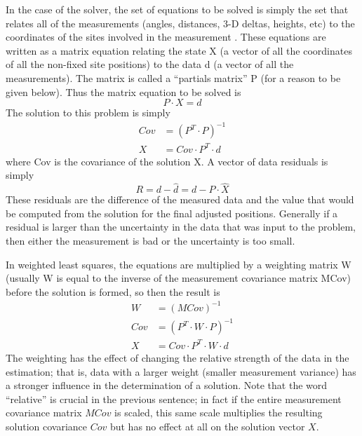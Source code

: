 In the case of the solver, the set of equations to be solved is simply the set that relates all of the measurements (angles, distances, 3-D deltas, heights, etc) to the coordinates of the sites involved in the measurement \cite{ghilani} \cite{leick}. These equations are written as a matrix equation relating the state X (a vector of all the coordinates of all the non-fixed site positions) to the data d (a vector of all the measurements). The matrix is called a ``partials matrix'' P (for a reason to be given below). Thus the matrix equation to be solved is
\begin{equation}
P \cdot X = d
\end{equation}
The solution to this problem is simply
\begin{equation}
\begin{split}
Cov &= (P^T \cdot P)^{-1} \\
X &= Cov \cdot P^T \cdot d
\end{split}
\end{equation}
where Cov is the covariance of the solution X. A vector of data residuals is simply
\begin{equation}
R = d - \hat{d} = d - P \cdot \hat{X}
\end{equation}
These residuals are the difference of the measured data and the value that would be computed from the solution for the final adjusted positions. Generally if a residual is larger than the uncertainty in the data that was input to the problem, then either the measurement is bad or the uncertainty is too small.

In weighted least squares, the equations are multiplied by a weighting matrix W (usually W is equal to the inverse of the measurement covariance matrix MCov) before the solution is formed, so then the result is
\begin{equation}
\begin{split}
W &= (MCov)^{-1} \\
Cov &= (P^T \cdot W \cdot P)^{-1} \\
X &= Cov \cdot P^T  \cdot W \cdot d
\end{split}
\end{equation}
The weighting has the effect of changing the relative strength of the data in the estimation; that is, data with a larger weight (smaller measurement variance) has a stronger influence in the determination of a solution. Note that the word ``relative'' is crucial in the previous sentence; in fact if the entire measurement covariance matrix $MCov$ is scaled, this same scale multiplies the resulting solution covariance $Cov$ but has no effect at all on the solution vector $X$.

